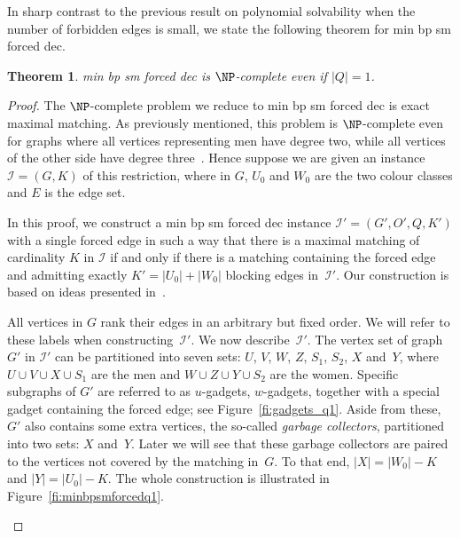 \documentclass[preprint,12pt]{elsarticle}
\newtheorem{theorem}{Theorem}[section]
\begin{document}
In sharp contrast to the previous result on polynomial solvability when the number of forbidden edges is small, we state the following theorem for {\sc min bp sm forced dec}.

\begin{theorem}
\label{th:minbpforced1}
{\sc min bp sm forced dec} is $\NP$-complete even if $|Q| = 1$.
\end{theorem}

\begin{proof}
The $\NP$-complete problem we reduce to {\sc min bp sm forced dec} is {\sc exact maximal matching}.  As previously mentioned, this problem is $\NP$-complete even for graphs where all vertices representing men have degree two, while all vertices of the other side have degree three~\cite{OMa07}.  Hence suppose we are given an instance $\mathcal I=(G,K)$ of this restriction, where in $G$, $U_0$ and $W_0$ are the two colour classes and $E$ is the edge set.

In this proof, we construct a {\sc min bp sm forced dec} instance $\mathcal{I'}=(G',O',Q,K')$ with a single forced edge in such a way that there is a maximal matching of cardinality $K$ in $\mathcal{I}$ if and only if there is a matching containing the forced edge and admitting exactly $K'=|U_0|+|W_0|$ blocking edges in~$\mathcal{I'}$. Our construction is based on ideas presented in~\cite{BMM10}.
    
All vertices in $G$ rank their edges in an arbitrary but fixed order. We will refer to these labels when constructing~$\mathcal{I'}$.  We now describe~$\mathcal{I'}$. The vertex set of graph $G'$ in $\mathcal{I'}$  can be partitioned into seven sets: $U$, $V$, $W$, $Z$, $S_1$, $S_2$, $X$ and~$Y$, where $U\cup V\cup X\cup S_1$ are the men and $W\cup Z\cup Y\cup S_2$ are the women. Specific subgraphs of $G'$ are referred to as $u$-gadgets, $w$-gadgets, together with a special gadget containing the forced edge; see Figure~\ref{fi:gadgets_q1}. Aside from these, $G'$ also contains some extra vertices, the so-called \emph{garbage collectors}, partitioned into two sets: $X$ and~$Y$. Later we will see that these garbage collectors are paired to the vertices not covered by the matching in~$G$. To that end, $|X| = |W_0| - K$ and  $|Y| = |U_0| - K$. The whole construction is illustrated in Figure~\ref{fi:minbpsmforcedq1}.
    
\begin{figure}[h]
\centering
\begin{minipage}{0.3\textwidth}
\begin{tikzpicture}[scale=0.9, transform shape]


\end{tikzpicture}
\end{minipage}
\end{figure}
\end{proof}
\end{document}
